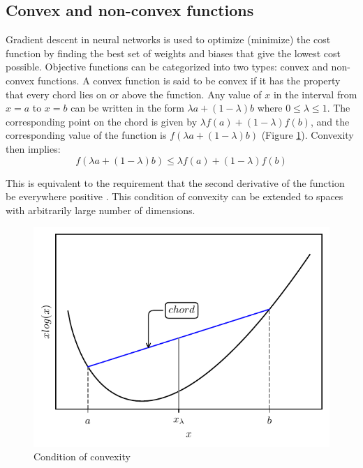 \subsection{Convex and non-convex functions}
Gradient descent in neural networks is used to optimize (minimize) the cost function by finding the best set of weights and biases that give the lowest cost possible. Objective functions can be categorized into two types: convex and non-convex functions.
A convex function is said to be convex if it has the property that every chord lies on or above the function. Any value of $x$ in the interval from $x=a$ to $x=b$ can be written in the form $\lambda a+(1-\lambda)b$ where $0\leq\lambda\leq 1$. The corresponding point on the chord is given by $\lambda f(a)+(1-\lambda)f(b)$, and the corresponding value of the function is $f(\lambda a+(1-\lambda)b)$ (Figure \ref{fig:convexity}). Convexity then implies:
\begin{equation}
    f(\lambda a+(1-\lambda)b)\leq \lambda f(a)+(1-\lambda)f(b)
    \label{equation:convexity}
\end{equation}

This is equivalent to the requirement that the second derivative of the function be everywhere positive \cite{Bishop2006}. This condition of convexity can be extended to spaces with arbitrarily large number of dimensions.

\begin{figure}[h]
    \centering
    \includegraphics{figures/convex_function.pdf}
    \caption{Condition of convexity}
    \label{fig:convexity}
\end{figure}

